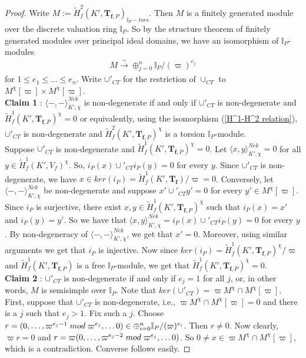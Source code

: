 \documentclass[reqno,10pt]{amsart}
\newcommand{\I}{\mathbb{I}}
\newcommand{\f}{\mathbf{f}}
\newcommand{\T}{\mathbf{T}}
\newcommand{\ip}{\I_P}
\newcommand{\tfp}{\mathbf{T}_{\mathbf{f},P}}
\theoremstyle{plain}
\theoremstyle{definition}
\begin{document}
\begin{proof}
    Write $M := \widetilde{H}^2_f(K',\tfp)_{\ip-tors}$. Then $M$ is a finitely generated module over the discrete valuation ring $\ip$. So by the structure theorem of finitely generated modules over principal ideal domains, we have an isomorphism of $\ip$-modules
        \begin{align*}
            M \xrightarrow{\sim} \oplus_{j = 0}^{n} \ip/(\varpi)^{e_j} 
        \end{align*}
        for $1 \leq e_1 \leq \ldots \leq e_n$. Write $\cup'_{CT}$ for the restriction of $\cup_{CT}$ to ${M^\chi[\varpi] \times M^\chi[\varpi]}$.
        \\
        \textbf{Claim 1} : $\langle -,- \rangle^{Nek}_{K',\chi}$ is non-degenerate if and only if $\cup'_{CT}$ is non-degenerate and $\widetilde{H}^1_f(K',\tfp)^\chi = 0$ or equivalently, using the isomorphism (\ref{H^1-H^2 relation}), $\cup'_{CT}$ is non-degenerate and $\widetilde{H}^2_f(K',\tfp)^\chi$ is a torsion $\ip$-module.
        \\
        Suppose $\cup'_{CT}$ is non-degenerate and $\widetilde{H}^1_f(K',\tfp)^\chi = 0$. Let $\langle x,y \rangle^{Nek}_{K',\chi} = 0$ for all $y \in \widetilde{H}^1_f(K',V_f)^\chi$. So, $i_P(x) \cup'_{CT} i_P(y) = 0$ for every $y$. Since $\cup'_{CT}$ is non-degenerate, we have $x \in ker(i_P) = \widetilde{H}^1_f(K',\T_\f)/\varpi = 0$. Conversely, let $\langle -,- \rangle^{Nek}_{K',\chi}$ be non-degenerate and suppose $x' \cup'_{CT} y' = 0$ for every $y' \in M^\chi[\varpi]$. Since $i_P$ is surjective, there exist $x,y \in \widetilde{H}^1_f(K',\tfp)^\chi$ such that $i_P(x) = x'$ and $i_P(y) = y'$. So we have that $\langle x,y \rangle^{Nek}_{K',\chi} = i_P(x) \cup'_{CT} i_P(y) = 0$ for every $y$. By non-degeneracy of $\langle -,- \rangle^{Nek}_{K',\chi}$, we get that $x' = 0$. Moreover, using similar arguments we get that $i_P$ is injective. Now since $ker(i_P) = \widetilde{H}^1_f(K',\tfp)^\chi/\varpi$ and $\widetilde{H}^1_f(K',\tfp)$ is a free $\ip$-module, we get that $\widetilde{H}^1_f(K',\tfp)^\chi = 0$.
        \\
        
        \textbf{Claim 2} :  $\cup'_{CT}$ is non-degenerate if and only if $e_j = 1$ for all $j$, or, in other words, $M$ is semisimple over $\ip$.
         Note that $ker(\cup'_{CT}) = \varpi M^\chi \cap M^\chi[\varpi]$. First, suppose that $\cup'_{CT}$ is non-degenerate, i.e., $\varpi M^\chi \cap M^\chi[\varpi] = 0$ and there is a $j$ such that $e_j > 1$. Fix such a $j$. Choose $r = (0,\ldots,\varpi^{e_j-1} \hspace{1mm} mod \hspace{1mm} \varpi^{e_j},\ldots 0) \in \oplus_{i = 0}^{n} \ip/(\varpi)^{e_i}$. Then $r \neq 0$. Now clearly, $\varpi r = 0$ and $r = \varpi(0,\ldots,\varpi^{e_j-2} \hspace{1mm} mod \hspace{1mm} \varpi^{e_j},\ldots 0)$. So $0 \neq x \in \varpi M^\chi \cap M^\chi[\varpi]$, which is a contradiction. Converse follows easily.
\end{proof}
\end{document}
